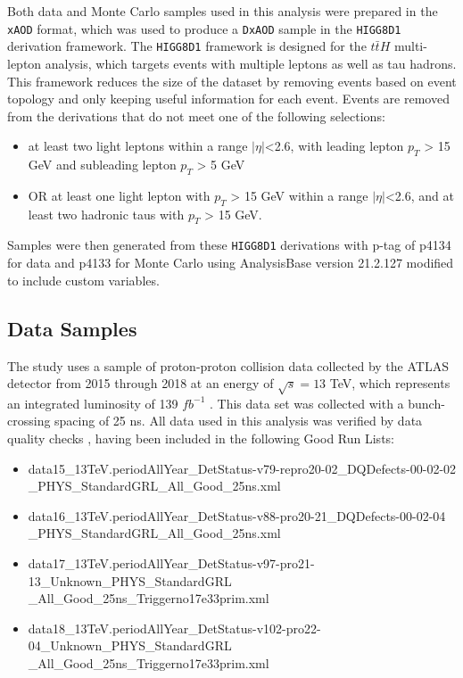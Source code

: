 
Both data and Monte Carlo samples used in this analysis were prepared in the \verb|xAOD| format, which was used to produce a \verb|DxAOD| sample in the \verb|HIGG8D1| derivation framework. The \verb|HIGG8D1| framework is designed for the $t\bar{t}H$ multi-lepton analysis, which targets events with multiple leptons as well as tau hadrons. This framework reduces the size of the dataset by removing events based on event topology and only keeping useful information for each event. Events are removed from the derivations that do not meet one of the following selections:

\begin{itemize}
    \item at least two light leptons within a range $|\eta|$<2.6, with leading lepton $p_{T}$ > 15 GeV and subleading lepton $p_{T}$ > 5 GeV
    \item OR at least one light lepton with $p_{T}$ > 15 GeV within a range $|\eta|$<2.6, and at least two hadronic taus with $p_{T}$ > 15 GeV.
\end{itemize}

Samples were then generated from these \verb|HIGG8D1| derivations with p-tag of p4134 for data and p4133 for Monte Carlo using AnalysisBase version 21.2.127 modified to include custom variables.

\subsection{Data Samples}

The study uses a sample of proton-proton collision data collected by the ATLAS detector from 2015 through 2018 at an energy of $\sqrt{s} = 13$ TeV, which represents an integrated luminosity of 139 $fb^{-1}$ \cite{lumi}. This data set was collected with a bunch-crossing spacing of 25 ns. All data used in this analysis was verified by data quality checks \cite{PERF-2010-01}, having been included in the following Good Run Lists: 
\begin{itemize}
    \item data15\_13TeV.periodAllYear\_DetStatus-v79-repro20-02\_DQDefects-00-02-02\\\_PHYS\_StandardGRL\_All\_Good\_25ns.xml
    \item data16\_13TeV.periodAllYear\_DetStatus-v88-pro20-21\_DQDefects-00-02-04\\\_PHYS\_StandardGRL\_All\_Good\_25ns.xml 
    \item data17\_13TeV.periodAllYear\_DetStatus-v97-pro21-13\_Unknown\_PHYS\_StandardGRL\\\_All\_Good\_25ns\_Triggerno17e33prim.xml 
    \item data18\_13TeV.periodAllYear\_DetStatus-v102-pro22-04\_Unknown\_PHYS\_StandardGRL\\\_All\_Good\_25ns\_Triggerno17e33prim.xml
\end{itemize}

